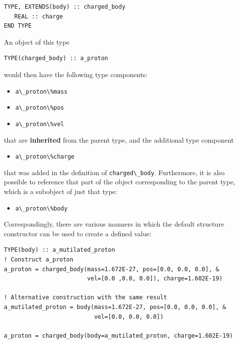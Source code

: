 \documentclass[
  paper=a4,
  ,captions=tableheading
]{scrartcl}
\newcommand{\passthrough}[1]{#1}
\providecommand{\tightlist}{%
  \setlength{\itemsep}{0pt}\setlength{\parskip}{0pt}}
\begin{document}
\begin{lstlisting}
TYPE, EXTENDS(body) :: charged_body
   REAL :: charge
END TYPE
\end{lstlisting}

An object of this type

\begin{lstlisting}
TYPE(charged_body) :: a_proton
\end{lstlisting}

would then have the following type components:

\begin{itemize}
\tightlist
\item
  \passthrough{\lstinline!a\_proton\%mass!}
\item
  \passthrough{\lstinline!a\_proton\%pos!}
\item
  \passthrough{\lstinline!a\_proton\%vel!}
\end{itemize}

that are \textbf{inherited} from the parent type, and the additional
type component

\begin{itemize}
\tightlist
\item
  \passthrough{\lstinline!a\_proton\%charge!}
\end{itemize}

that was added in the definition of
\passthrough{\lstinline!charged\_body!}. Furthermore, it is also
possible to reference that part of the object corresponding to the
parent type, which is a subobject of just that type:

\begin{itemize}
\tightlist
\item
  \passthrough{\lstinline!a\_proton\%body!}
\end{itemize}

Correspondingly, there are various manners in which the default
structure constructor can be used to create a defined value:

\begin{lstlisting}
TYPE(body) :: a_mutilated_proton
! Construct a_proton
a_proton = charged_body(mass=1.672E-27, pos=[0.0, 0.0, 0.0], &
                        vel=[0.0 ,0.0, 0.0]), charge=1.602E-19)

! Alternative construction with the same result
a_mutilated_proton = body(mass=1.672E-27, pos=[0.0, 0.0, 0.0], &
                          vel=[0.0, 0.0, 0.0])

a_proton = charged_body(body=a_mutilated_proton, charge=1.602E-19)
\end{lstlisting}
\end{document}
